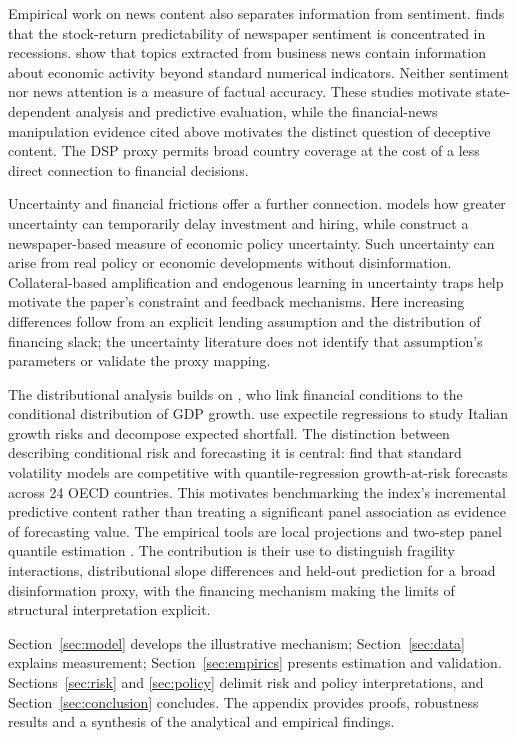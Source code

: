 Empirical work on news content also separates information from sentiment.
\citet{garcia2013sentiment} finds that the stock-return predictability of
newspaper sentiment is concentrated in recessions. \citet{bybee2024business}
show that topics extracted from business news contain information about
economic activity beyond standard numerical indicators. Neither sentiment
nor news attention is a measure of factual accuracy. These studies motivate
state-dependent analysis and predictive evaluation, while the financial-news
manipulation evidence cited above motivates the distinct question of deceptive
content. The DSP proxy permits broad country coverage at the cost of a less
direct connection to financial decisions.

Uncertainty and financial frictions offer a further connection.
\citet{bloom2009impact} models how greater uncertainty can temporarily delay
investment and hiring, while \citet{baker2016measuring} construct a
newspaper-based measure of economic policy uncertainty. Such uncertainty can
arise from real policy or economic developments without disinformation.
Collateral-based amplification \citep{kiyotaki1997credit,bernanke1999financial}
and endogenous learning in uncertainty traps \citep{fajgelbaum2017uncertainty}
help motivate the paper's constraint and feedback mechanisms. Here increasing
differences follow from an explicit lending assumption and the distribution
of financing slack; the uncertainty literature does not identify that
assumption's parameters or validate the proxy mapping.

The distributional analysis builds on \citet{adrian2019vulnerable}, who link
financial conditions to the conditional distribution of GDP growth.
\citet{busetti2021risk} use expectile
regressions to study Italian growth risks and decompose expected shortfall.
The distinction between describing conditional risk and forecasting it is
central: \citet{brownlees2021backtesting} find that standard volatility models
are competitive with quantile-regression growth-at-risk forecasts across
24 OECD countries. This motivates benchmarking the index's incremental
predictive content rather than treating a significant panel association as
evidence of forecasting value. The empirical tools are local projections
\citep{jorda2005estimation} and two-step panel quantile estimation
\citep{canay2011simple}. The contribution is their use to distinguish
fragility interactions, distributional slope differences and held-out
prediction for a broad disinformation proxy, with the financing mechanism
making the limits of structural interpretation explicit.

Section~\ref{sec:model} develops the illustrative mechanism;
Section~\ref{sec:data} explains measurement; Section~\ref{sec:empirics}
presents estimation and validation. Sections~\ref{sec:risk} and
\ref{sec:policy} delimit risk and policy interpretations, and
Section~\ref{sec:conclusion} concludes. The appendix provides proofs,
robustness results and a synthesis of the analytical and empirical findings.
